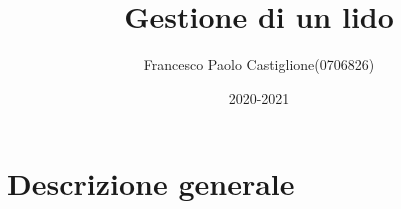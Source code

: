 \documentclass{article}
\title{Gestione di un lido}
\author{Francesco Paolo Castiglione(0706826)}
\date{2020-2021}
\begin{document}
	\maketitle
	\section{Descrizione generale}
	

	
	
\end{document}
